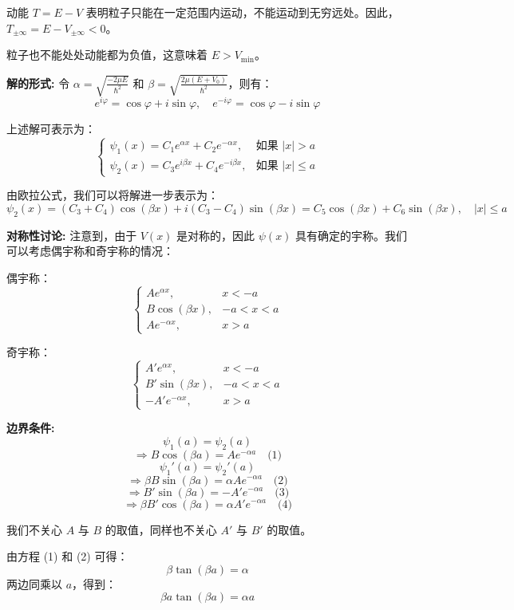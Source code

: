 \documentclass[lang=cn,10pt]{elegantbook}
\begin{document}
\begin{solution}
	动能 $T = E - V$ 表明粒子只能在一定范围内运动，不能运动到无穷远处。因此，$T_{\pm\infty} = E - V_{\pm\infty} < 0$。
	
	粒子也不能处处动能都为负值，这意味着 $E > V_{\text{min}}$。
	
	\textbf{解的形式:}
	令 $\alpha = \sqrt{\frac{-2\mu E}{\hbar^2}}$ 和 $\beta = \sqrt{\frac{2\mu(E+V_0)}{\hbar^2}}$，则有：
	\[
	e^{i\varphi} = \cos\varphi + i\sin\varphi, \quad e^{-i\varphi} = \cos\varphi - i\sin\varphi
	\]
	
	上述解可表示为：
	\[
	\begin{cases} 
		\psi_1(x) = C_1 e^{\alpha x} + C_2 e^{-\alpha x}, & \text{如果 } |x| > a \\
		\psi_2(x) = C_3 e^{i\beta x} + C_4 e^{-i\beta x}, & \text{如果 } |x| \leq a
	\end{cases}
	\]
	
	由欧拉公式，我们可以将解进一步表示为：
	\[
	\psi_2(x) = (C_3 + C_4) \cos(\beta x) + i(C_3 - C_4) \sin(\beta x) = C_5 \cos(\beta x) + C_6 \sin(\beta x), \quad |x| \leq a
	\]
	
	\textbf{对称性讨论:}
	注意到，由于 $V(x)$ 是对称的，因此 $\psi(x)$ 具有确定的宇称。我们可以考虑偶宇称和奇宇称的情况：
	
	偶宇称：
	\[
	\begin{cases} 
		A e^{\alpha x}, & x < -a \\
		B \cos(\beta x), & -a < x < a \\
		A e^{-\alpha x}, & x > a
	\end{cases}
	\]
	
	奇宇称：
	\[
	\begin{cases} 
		A' e^{\alpha x}, & x < -a \\
		B' \sin(\beta x), & -a < x < a \\
		-A' e^{-\alpha x}, & x > a
	\end{cases}
	\]
	
\textbf{边界条件:}
\[
\psi_1(a) = \psi_2(a)
\]
\[
\Rightarrow B \cos(\beta a) = A e^{-\alpha a} \quad \text{(1)}
\]
	\[
	\psi_1'(a) = \psi_2'(a)
	\]
	\[
	\Rightarrow \beta B \sin(\beta a) = \alpha A e^{-\alpha a} \quad \text{(2)}
	\]
	\[
	\Rightarrow B' \sin(\beta a) = -A' e^{-\alpha a} \quad \text{(3)}
	\]
	\[
	\Rightarrow \beta B' \cos(\beta a) = \alpha A' e^{-\alpha a} \quad \text{(4)}
	\]

我们不关心 \(A\) 与 \(B\) 的取值，同样也不关心 \(A'\) 与 \(B'\) 的取值。

由方程 (1) 和 (2) 可得：
\[
\beta \tan(\beta a) = \alpha
\]
两边同乘以 \(a\)，得到：
\[
\beta a \tan(\beta a) = \alpha a
\]


\end{solution}
\end{document}
